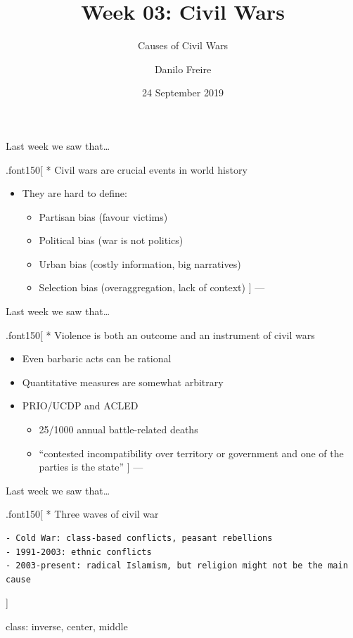 \documentclass[ignorenonframetext,]{beamer}
\title{Week 03: Civil Wars}
\subtitle{Causes of Civil Wars}
\author{Danilo Freire}
\date{24 September 2019}
\providecommand{\tightlist}{%
  \setlength{\itemsep}{0pt}\setlength{\parskip}{0pt}}
\begin{document}
\frame{\titlepage}

\begin{frame}

\end{frame}

\begin{frame}{Last week we saw that\ldots{}}

.font150{[} * Civil wars are crucial events in world history

\begin{itemize}
\tightlist
\item
  They are hard to define:

  \begin{itemize}
  \tightlist
  \item
    Partisan bias (favour victims)
  \item
    Political bias (war is not politics)
  \item
    Urban bias (costly information, big narratives)
  \item
    Selection bias (overaggregation, lack of context) {]} ---
  \end{itemize}
\end{itemize}

\end{frame}

\begin{frame}{Last week we saw that\ldots{}}

.font150{[} * Violence is both an outcome and an instrument of civil
wars

\begin{itemize}
\item
  Even barbaric acts can be rational
\item
  Quantitative measures are somewhat arbitrary
\item
  PRIO/UCDP and ACLED

  \begin{itemize}
  \tightlist
  \item
    25/1000 annual battle-related deaths
  \item
    ``contested incompatibility over territory or government and one of
    the parties is the state'' {]} ---
  \end{itemize}
\end{itemize}

\end{frame}

\begin{frame}[fragile]{Last week we saw that\ldots{}}

.font150{[} * Three waves of civil war

\begin{verbatim}
- Cold War: class-based conflicts, peasant rebellions
- 1991-2003: ethnic conflicts 
- 2003-present: radical Islamism, but religion might not be the main cause
\end{verbatim}

\begin{block}{{]}}

class: inverse, center, middle

\end{block}

\end{frame}
\end{document}
